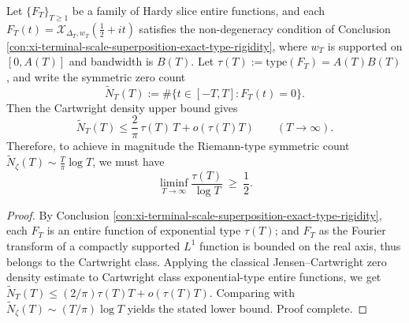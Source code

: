 \begin{conclusion}\label{con:xi-terminal-zero-density-product-lower-bound}
Let \(\{F_T\}_{T\ge 1}\) be a family of Hardy slice entire functions,
and each \(F_T(t)=\mathcal X_{\Delta_T,w_T}(\tfrac12+it)\) satisfies the non-degeneracy condition of Conclusion \ref{con:xi-terminal-scale-superposition-exact-type-rigidity},
where \(w_T\) is supported on \([0,A(T)]\) and bandwidth is \(B(T)\).
Let
\(
\tau(T):=\mathrm{type}(F_T)=A(T)B(T)
\), and write the symmetric zero count
\[
\widetilde N_T(T):=\#\{t\in[-T,T]:F_T(t)=0\}.
\]
Then the Cartwright density upper bound gives
\[
\widetilde N_T(T)\le \frac{2}{\pi}\,\tau(T)\,T+o(\tau(T)T)\qquad(T\to\infty).
\]
Therefore, to achieve in magnitude the Riemann-type symmetric count \(\widetilde N_\zeta(T)\sim \frac{T}{\pi}\log T\), we must have
\[
\liminf_{T\to\infty}\frac{\tau(T)}{\log T}\ \ge\ \frac12.
\]
\end{conclusion}
\begin{proof}[Proof]
By Conclusion \ref{con:xi-terminal-scale-superposition-exact-type-rigidity}, each \(F_T\) is an entire function of exponential type \(\tau(T)\); and \(F_T\) as the Fourier transform of a compactly supported \(L^1\) function is bounded on the real axis,
thus belongs to the Cartwright class.
Applying the classical Jensen--Cartwright zero density estimate to Cartwright class exponential-type entire functions, we get
\(
\widetilde N_T(T)\le (2/\pi)\tau(T)T+o(\tau(T)T)
\).
Comparing with \(\widetilde N_\zeta(T)\sim (T/\pi)\log T\) yields the stated lower bound. Proof complete.
\end{proof}

